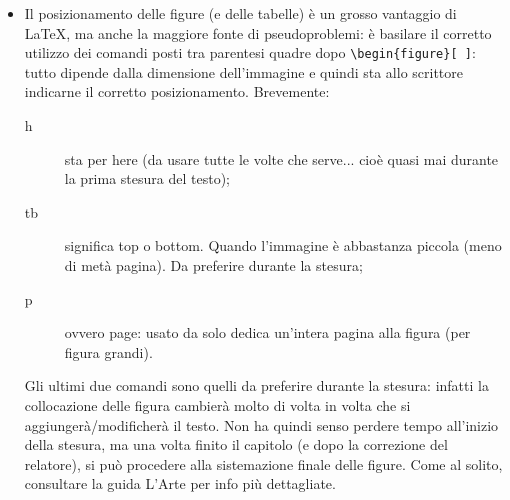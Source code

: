 \documentclass[paper=a4, fontsize=11pt]{scrartcl}	%
\numberwithin{equation}{section}		%
\numberwithin{figure}{section}			%
\numberwithin{table}{section}				%
\begin{document}
\begin{itemize}
Ad esempio:\\
\hspace{1 cm} \texttt{\textbackslash includegraphics[width=0.45\textbackslash textwidth]\{./Figure/ExampleFigure1\}}\\
e NON:\\
\hspace{1 cm} \texttt{\textbackslash inludegraphics[width=0.45\textbackslash textwidth]\{./Figure/ExampleFigure1.jpeg\}}
\item Il posizionamento delle figure (e delle tabelle) \`e un grosso vantaggio di \LaTeX, ma anche la maggiore fonte di pseudoproblemi: \`e basilare il corretto utilizzo dei comandi posti tra parentesi quadre dopo \texttt{\textbackslash begin\{figure\}[ ]}: tutto dipende dalla dimensione dell'immagine e quindi sta allo scrittore indicarne il corretto posizionamento. Brevemente:
\begin{description}
\item[h] sta per here (da usare tutte le volte che serve... cio\`e quasi mai durante la prima stesura del testo);
\item[tb] significa top o bottom. Quando l'immagine \`e abbastanza piccola (meno di met\`a pagina). Da preferire durante la stesura;
\item[p] ovvero page: usato da solo dedica un'intera pagina alla figura (per figura grandi). 
\end{description}
Gli ultimi due comandi sono quelli da preferire durante la stesura: infatti la collocazione delle figura cambier\`a molto di volta in volta che si aggiunger\`a/modificher\`a il testo. 
Non ha quindi senso perdere tempo all'inizio della stesura, ma una volta finito il capitolo (e dopo la correzione del relatore), si pu\`o procedere alla sistemazione finale delle figure. 
Come al solito, consultare la guida L'Arte per info pi\`u dettagliate.


\end{itemize}
\end{document}
